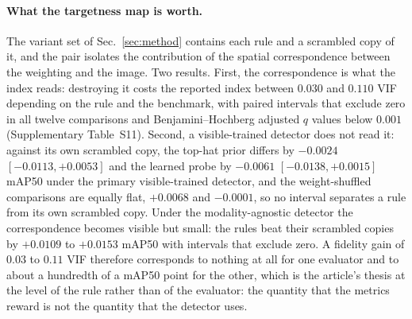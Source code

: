 \documentclass[journal]{IEEEtran}
\begin{document}
\begin{sloppypar}
\paragraph{What the targetness map is worth.} The variant set of
Sec.~\ref{sec:method} contains each rule and a scrambled copy of it, and the pair
isolates the contribution of the spatial correspondence between the weighting and the
image. Two results. First, the correspondence is what the index reads: destroying it
costs the reported index between $0.030$ and $0.110$ VIF depending on the rule and the
benchmark, with paired intervals that exclude zero in all twelve comparisons and
Benjamini--Hochberg adjusted $q$ values below $0.001$ (Supplementary Table~S11). Second,
a visible-trained detector does not read it: against its own scrambled copy, the
top-hat prior differs by $-0.0024$ $[-0.0113,+0.0053]$ and the learned probe by
$-0.0061$ $[-0.0138,+0.0015]$ mAP50 under the primary visible-trained detector, and the
weight-shuffled comparisons are equally flat, $+0.0068$ and $-0.0001$, so no interval
separates a rule from its own scrambled copy. Under the modality-agnostic detector the
correspondence becomes visible but small: the rules beat their scrambled copies by
$+0.0109$ to $+0.0153$ mAP50 with intervals that exclude zero. A fidelity gain of
$0.03$ to $0.11$ VIF therefore corresponds to nothing at all for one evaluator and to
about a hundredth of a mAP50 point for the other, which is the article's thesis at the
level of the rule rather than of the evaluator: the quantity that the metrics reward
is not the quantity that the detector uses.


\end{sloppypar}
\end{document}
